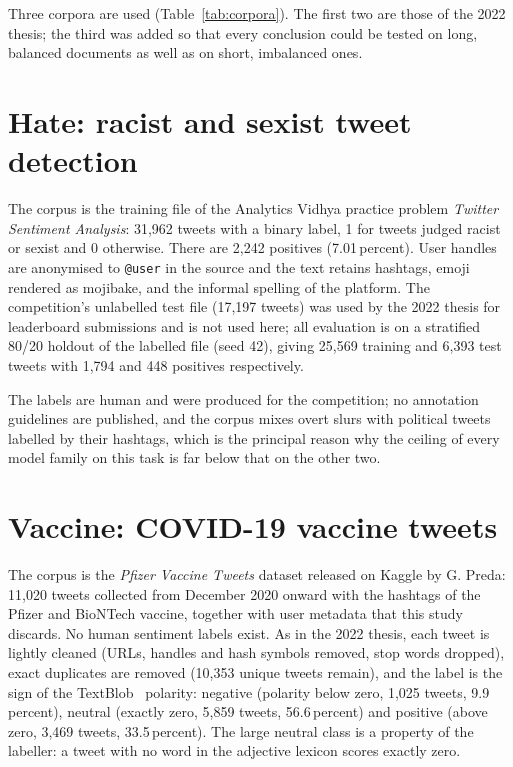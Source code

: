 Three corpora are used (Table~\ref{tab:corpora}). The first two are those of the 2022 thesis; the third was added so that every conclusion could be tested on long, balanced documents as well as on short, imbalanced ones.



\section{Hate: racist and sexist tweet detection}
The corpus is the training file of the Analytics Vidhya practice problem \emph{Twitter Sentiment Analysis}: 31,962 tweets with a binary label, 1 for tweets judged racist or sexist and 0 otherwise. There are 2,242 positives (7.01\,percent). User handles are anonymised to \texttt{@user} in the source and the text retains hashtags, emoji rendered as mojibake, and the informal spelling of the platform. The competition's unlabelled test file (17,197 tweets) was used by the 2022 thesis for leaderboard submissions and is not used here; all evaluation is on a stratified 80/20 holdout of the labelled file (seed 42), giving 25,569 training and 6,393 test tweets with 1,794 and 448 positives respectively.

The labels are human and were produced for the competition; no annotation guidelines are published, and the corpus mixes overt slurs with political tweets labelled by their hashtags, which is the principal reason why the ceiling of every model family on this task is far below that on the other two.

\section{Vaccine: COVID-19 vaccine tweets}
The corpus is the \emph{Pfizer Vaccine Tweets} dataset released on Kaggle by G. Preda: 11,020 tweets collected from December 2020 onward with the hashtags of the Pfizer and BioNTech vaccine, together with user metadata that this study discards. No human sentiment labels exist. As in the 2022 thesis, each tweet is lightly cleaned (URLs, handles and hash symbols removed, stop words dropped), exact duplicates are removed (10,353 unique tweets remain), and the label is the sign of the TextBlob~\cite{loria2018} polarity: negative (polarity below zero, 1,025 tweets, 9.9\,percent), neutral (exactly zero, 5,859 tweets, 56.6\,percent) and positive (above zero, 3,469 tweets, 33.5\,percent). The large neutral class is a property of the labeller: a tweet with no word in the adjective lexicon scores exactly zero.

